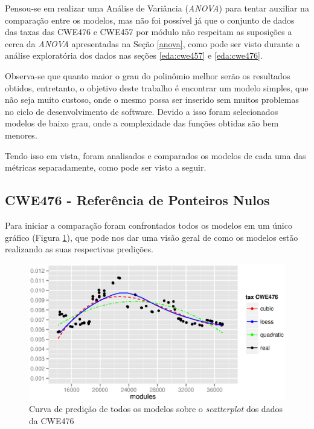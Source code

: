 Pensou-se em realizar uma Análise de Variância (\textit{ANOVA}) para tentar
auxiliar na comparação entre os modelos, mas não foi possível já que o conjunto
de dados das taxas das CWE476 e CWE457 por módulo não respeitam as suposições a
cerca da \textit{ANOVA} apresentadas na Seção \ref{anova}, como pode ser visto
durante a análise exploratória dos dados nas seções \ref{eda:cwe457} e
\ref{eda:cwe476}.

Observa-se que quanto maior o grau do polinômio melhor serão os resultados
obtidos, entretanto, o objetivo deste trabalho é encontrar um modelo simples,
que não seja muito custoso, onde o mesmo possa ser inserido sem muitos problemas
no ciclo de desenvolvimento de software. Devido a isso foram selecionados
modelos de baixo grau, onde a complexidade das funções obtidas são bem menores.

Tendo isso em vista, foram analisados e comparados os modelos de cada uma das
métricas separadamente, como pode ser visto a seguir.

\subsection{CWE476 - Referência de Ponteiros Nulos}\label{comparacaocwe476}

Para iniciar a comparação foram confrontados todos os modelos em um único
gráfico (Figura \ref{fig:cwe476-all-models}), que pode nos dar uma visão geral de
como os modelos estão realizando as suas respectivas predições.

\begin{figure}[h]
  \centering
  \includegraphics[width=1.0\textwidth]
      {figuras/cwe476-all-models.eps}
      \caption{Curva de predição de todos os modelos sobre o \textit{scatterplot}
      dos dados da CWE476}
  \label{fig:cwe476-all-models}
\end{figure}

